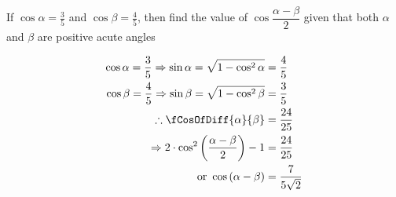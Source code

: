 
%
%
%
%
% 
% 
\question[3] If $\cos\alpha = \frac{3}{5}$ and $\cos\beta = \frac{4}{5}$, then find the 
value of $\cos\dfrac{\alpha-\beta}{2}$ given that both $\alpha$ and $\beta$ are positive
acute angles


\ifprintanswers
\fi 

\begin{solution}[\halfpage]
	\begin{align}
	   \cos\alpha = \dfrac{3}{5} \Rightarrow \sin\alpha = \sqrt{1-\cos^2\alpha} &= \dfrac{4}{5} \\
	   \cos\beta = \dfrac{4}{5} \Rightarrow \sin\beta = \sqrt{1-\cos^2\beta} &= \dfrac{3}{5} \\
	   \therefore \fCosOfDiff{\alpha}{\beta} &= \dfrac{24}{25} \\
	   \Rightarrow 2\cdot\cos^2\left( \dfrac{\alpha-\beta}{2}\right) - 1 &= \dfrac{24}{25} \\
	   \text{ or } \cos\left(\alpha-\beta \right) &= \dfrac{7}{5\sqrt2}
	\end{align}
\end{solution}
